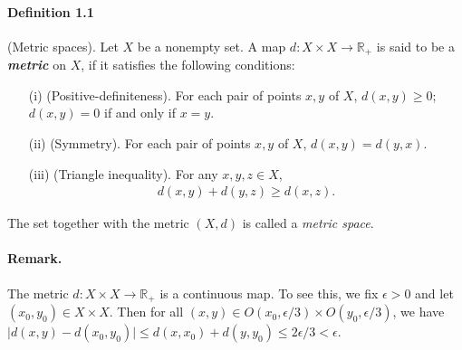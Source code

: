 \documentclass{article}
\begin{document}
\paragraph{Definition 1.1\label{def:1.1}} (Metric spaces). Let $X$ be a nonempty set. A map $d:X\times X\to\mathbb{R}_+$ is said to be a \textbf{\it metric} on $X$, if it satisfies the following conditions:
\begin{itemize}
	\item[(i)] (Positive-definiteness). For each pair of points $x,y$ of $X$, $d(x,y)\geq 0$; $d(x,y)=0$ if and only if $x=y$.
	\item[(ii)] (Symmetry). For each pair of points $x,y$ of $X$, $d(x,y)= d(y,x)$.
	\item[(iii)] (Triangle inequality). For any $x,y,z\in X$,
	\begin{align*}
		d(x,y) + d(y,z)\geq d(x,z).
	\end{align*}
\end{itemize}
The set together with the metric $(X,d)$ is called a \textit{metric space}.

\paragraph{Remark.} The metric $d:X\times X\to\mathbb{R}_+$ is a continuous map. To see this, we fix $\epsilon >0$ and let $(x_0,y_0)\in X\times X$. Then for all $(x,y)\in O(x_0,\epsilon/3)\times O(y_0,\epsilon/3)$, we have $\vert d(x,y) - d(x_0,y_0)\vert\leq d(x,x_0) + d(y,y_0) \leq 2\epsilon/3 < \epsilon$.
\end{document}
